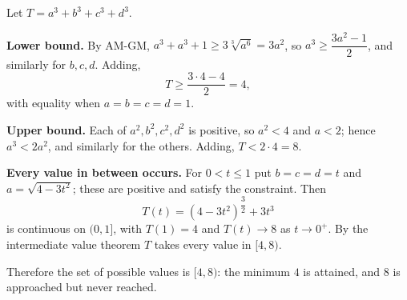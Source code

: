 Let $T=a^3+b^3+c^3+d^3$.

\textbf{Lower bound.} By AM-GM, $a^3+a^3+1\ge3\sqrt[3]{a^6}=3a^2$, so $a^3\ge\dfrac{3a^2-1}{2}$, and similarly for $b,c,d$. Adding,
\[
T\ge\dfrac{3\cdot4-4}{2}=4,
\]
with equality when $a=b=c=d=1$.

\textbf{Upper bound.} Each of $a^2,b^2,c^2,d^2$ is positive, so $a^2<4$ and $a<2$; hence $a^3<2a^2$, and similarly for the others. Adding, $T<2\cdot4=8$.

\textbf{Every value in between occurs.} For $0<t\le1$ put $b=c=d=t$ and $a=\sqrt{4-3t^2}$; these are positive and satisfy the constraint. Then
\[
T(t)=(4-3t^2)^{\dfrac{3}{2}}+3t^3
\]
is continuous on $(0,1]$, with $T(1)=4$ and $T(t)\to8$ as $t\to0^+$. By the intermediate value theorem $T$ takes every value in $[4,8)$.

Therefore the set of possible values is $\boxed{[4,8)}$: the minimum $4$ is attained, and $8$ is approached but never reached.
